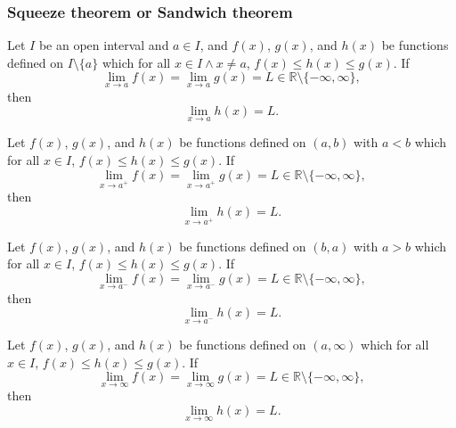 \documentclass[a4paper,12pt]{report}
\begin{document}
\subsubsection{Squeeze theorem or Sandwich theorem}
Let $I$ be an open interval and $a\in I$, and $f(x)$, $g(x)$, and $h(x)$ be functions defined on $I\setminus\{a\}$ which for all $x\in I\land x\neq a$, $f(x)\leq h(x)\leq g(x)$. If
\[\lim_{x\to a}f(x)=\lim_{x\to a}g(x)=L\in\mathbb{R}\setminus\{-\infty,\infty\},\]
then
\[\lim_{x\to a}h(x)=L.\]

Let $f(x)$, $g(x)$, and $h(x)$ be functions defined on $(a,b)$ with $a<b$ which for all $x\in I$, $f(x)\leq h(x)\leq g(x)$. If
\[\lim_{x\to a^+}f(x)=\lim_{x\to a^+}g(x)=L\in\mathbb{R}\setminus\{-\infty,\infty\},\]
then
\[\lim_{x\to a^+}h(x)=L.\]

Let $f(x)$, $g(x)$, and $h(x)$ be functions defined on $(b,a)$ with $a>b$ which for all $x\in I$, $f(x)\leq h(x)\leq g(x)$. If
\[\lim_{x\to a^-}f(x)=\lim_{x\to a^-}g(x)=L\in\mathbb{R}\setminus\{-\infty,\infty\},\]
then
\[\lim_{x\to a^-}h(x)=L.\]

Let $f(x)$, $g(x)$, and $h(x)$ be functions defined on $(a,\infty)$ which for all $x\in I$, $f(x)\leq h(x)\leq g(x)$. If
\[\lim_{x\to\infty}f(x)=\lim_{x\to\infty}g(x)=L\in\mathbb{R}\setminus\{-\infty,\infty\},\]
then
\[\lim_{x\to\infty}h(x)=L.\]
\end{document}
